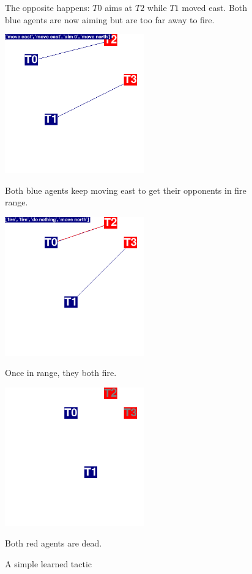 \begin{figure}
\begin{minipage}{.45\textwidth}
  \caption*{The opposite happens: $T0$ aims at $T2$ while $T1$ moved east. Both blue agents are now aiming but are too far away to fire.}
\end{minipage}%
\begin{minipage}{.1\textwidth}
\centering
  \caption*{ }
\end{minipage}%
\begin{minipage}{.45\textwidth}
  \centering
  \includegraphics[width=6cm]{images/animation03/screenshot04.png}
    \caption*{Both blue agents keep moving east to get their opponents in fire range.}
\end{minipage}
\begin{minipage}{.5\textwidth}
  \centering
  \includegraphics[width=6cm]{images/animation03/screenshot05.png}
    \caption*{Once in range, they both fire.}
\end{minipage}%
\begin{minipage}{.5\textwidth}
  \centering
  \includegraphics[width=6cm]{images/animation03/screenshot99.png}
  \caption*{Both red agents are dead.}
\end{minipage}
\caption{A simple learned tactic}
\label{fig:simple_tactic01}
\end{figure}

